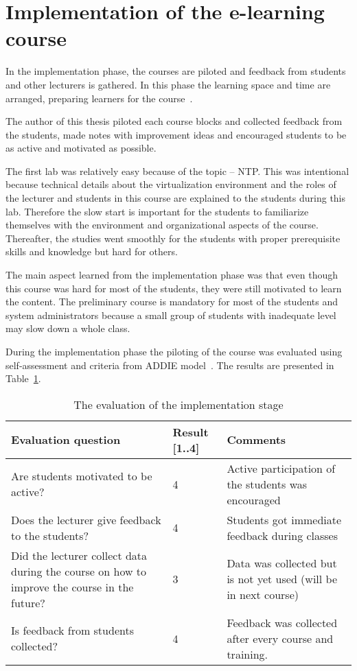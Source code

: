 \section{Implementation of the e-learning course}

In the implementation phase, the courses are piloted and feedback from students and other lecturers is gathered. In this phase the learning space and time are arranged, preparing learners for the course~\citep{OppeArenduskeskus2010}.

The author of this thesis piloted each course blocks and collected feedback from the students, made notes with improvement ideas and encouraged students to be as active and motivated as possible.

The first lab was relatively easy because of the topic -- \gls{NTP}. This was intentional because technical details about the virtualization environment and the roles of the lecturer and students in this course are explained to the students during this lab. Therefore the slow start is important for the students to familiarize themselves with the environment and organizational aspects of the course. Thereafter, the studies went smoothly for the students with proper prerequisite skills and knowledge but hard for others. 

The main aspect learned from the implementation phase was that even though this course was hard for most of the students, they were still motivated to learn the content. The preliminary course is mandatory for most of the students and system administrators because  a small group of students with inadequate level may slow down a whole class. 

During the implementation phase the piloting of the course was evaluated using self-assessment and criteria from \gls{ADDIE} model~\citep{OppeArenduskeskus2010}. The results are presented in Table~\ref{table:implementation_evaluation}.

\begin{table}[h]
\centering
\caption{The evaluation of the implementation stage }
{ \small 
\begin{tabular}{|p{6cm}|p{2cm}|p{5cm}|}
\hline 
\color{blue} Evaluation question & \color{blue} Result [1..4] & \color{blue} Comments \\ 
\hline
Are students motivated to be active? 
& 4  &  Active participation of the students was encouraged \\ 
\hline 
Does the lecturer give feedback to the students?
& 4 &  Students got immediate feedback during classes \\ 
\hline 
Did the lecturer collect data during the course on how to improve the course in the future?
& 3 & Data was collected but is not yet used (will be in next course) \\ 
\hline
Is feedback from students collected?
& 4 & Feedback was collected after every course and training. \\ 
\hline 
\end{tabular} 
}
\label{table:implementation_evaluation}
\end{table}

